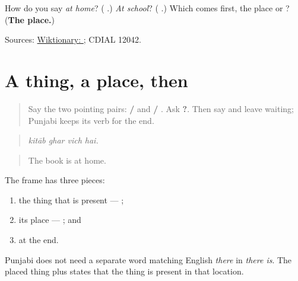 \begin{tcolorbox}[breakable,colback=teal!4,colframe=teal!35!black,title={Before you move on}]
How do you say \emph{at home}? (\textbf{ }.) \emph{At school}? (\textbf{ }.) Which comes first, the place or \textbf{}? (\textbf{The place.})

Sources: \href{https://en.wiktionary.org/wiki/\%E0\%A8\%B5\%E0\%A8\%BF\%E0\%A9\%B1\%E0\%A8\%9A}{Wiktionary: }; CDIAL 12042.
\end{tcolorbox}
\section[\texorpdfstring{\pa{ਕਿਤਾਬ} \pa{ਘਰ} \pa{ਵਿੱਚ} \pa{ਹੈ} (kitab ghar vich hai)}{ਕਿਤਾਬ ਘਰ ਵਿੱਚ ਹੈ (kitab ghar vich hai)}]{A thing, a place, then }

\label{lesson:PA-C176-location-frame}



\begin{quote}
Say the two pointing pairs: \textbf{ / } and \textbf{ / }. Ask \textbf{?}. Then say \textbf{ } and leave \textbf{} waiting; Punjabi keeps its verb for the end.
\end{quote}

\begin{grammarlens}[title={Grammar Lens: a thing, a place, then \pa{ਹੈ}}]
\begin{quote}
\textbf{   }
\end{quote}

\begin{quote}
\emph{kitāb ghar vich hai.}
\end{quote}

\begin{quote}
The book is at home.
\end{quote}

The frame has three pieces:

\begin{enumerate}
\raggedright
  \item the thing that is present — \textbf{};
  \item its place — \textbf{ }; and
  \item \textbf{} at the end.
\end{enumerate}

Punjabi does not need a separate word matching English \emph{there} in \emph{there is}. The placed thing plus \textbf{} states that the thing is present in that location.
\end{grammarlens}

